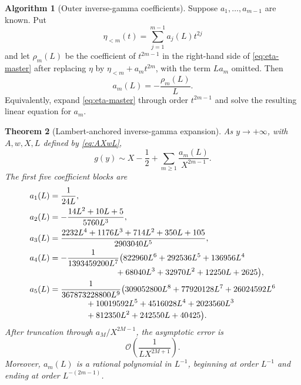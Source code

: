 \documentclass[11pt,oneside]{article}
\theoremstyle{plain}
\newtheorem{theorem}{Theorem}[section]
\theoremstyle{definition}
\newtheorem{algorithm}[theorem]{Algorithm}
\theoremstyle{remark}
\newcommand{\bigO}{\mathcal{O}}
\begin{document}
\begin{algorithm}[Outer inverse-gamma coefficients]
\label{alg:outer-coefficients}
Suppose \(a_1,\ldots,a_{m-1}\) are known.  Put
\[
 \eta_{<m}(t)=\sum_{j=1}^{m-1}a_j(L)t^{2j}
\]
and let \(\rho_m(L)\) be the coefficient of \(t^{2m-1}\) in the right-hand
side of \eqref{eq:eta-master} after replacing \(\eta\) by
\(\eta_{<m}+a_m t^{2m}\), with the term \(La_m\) omitted.  Then
\begin{equation}
 a_m(L)=-\frac{\rho_m(L)}{L}.
 \label{eq:am-recurrence}
\end{equation}
Equivalently, expand \eqref{eq:eta-master} through order \(t^{2m-1}\) and solve
the resulting linear equation for \(a_m\).
\end{algorithm}

\begin{theorem}[Lambert-anchored inverse-gamma expansion]
\label{thm:inverse-gamma-expansion}
As \(y\to+\infty\), with \(A,w,X,L\) defined by \eqref{eq:AXwL},
\begin{equation}
 \boxed{\quad
 g(y)\sim X-\frac12+\sum_{m\ge1}\frac{a_m(L)}{X^{2m-1}}.
 \quad}
 \label{eq:g-outer-main}
\end{equation}
The first five coefficient blocks are
\begin{align}
 a_1(L)&=\frac{1}{24L},
 \label{eq:a1}\\
 a_2(L)&=-\frac{14L^2+10L+5}{5760L^3},
 \label{eq:a2}\\
 a_3(L)&=\frac{2232L^4+1176L^3+714L^2+350L+105}
 {2903040L^5},
 \label{eq:a3}\\
 a_4(L)&=-\frac{1}{1393459200L^7}
 \bigl(822960L^6+292536L^5+136956L^4
 \notag\\[-0.2em]
 &\hspace{8em}{}+68040L^3+32970L^2+12250L+2625\bigr),
 \label{eq:a4}\\
 a_5(L)&=\frac{1}{367873228800L^9}
 \bigl(309052800L^8+77920128L^7+26024592L^6
 \notag\\[-0.2em]
 &\hspace{4.4em}{}+10019592L^5+4516028L^4+2023560L^3
 \notag\\[-0.2em]
 &\hspace{4.4em}{}+812350L^2+242550L+40425\bigr).
 \label{eq:a5}
\end{align}
After truncation through \(a_M/X^{2M-1}\), the asymptotic error is
\begin{equation}
 \bigO\!\left(\frac{1}{L X^{2M+1}}\right).
 \label{eq:g-outer-error}
\end{equation}
Moreover, \(a_m(L)\) is a rational polynomial in \(L^{-1}\), beginning at
order \(L^{-1}\) and ending at order \(L^{-(2m-1)}\).
\end{theorem}
\end{document}
